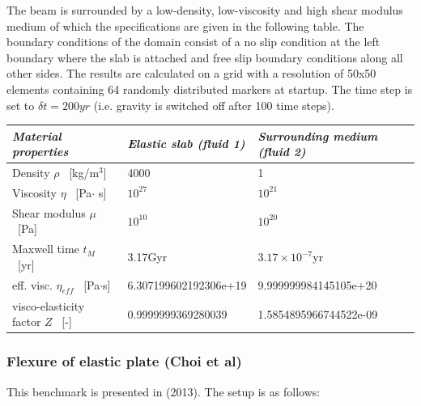 The beam is surrounded by a low-density, low-viscosity and high shear modulus medium
of which the specifications are given in  the following table.
The boundary conditions of the domain consist of a no slip condition at
the left boundary where the slab is attached and free slip boundary conditions along all other sides.
The results are calculated on a grid with a resolution of 50x50 elements containing 64 randomly distributed markers at startup.
The time step is set to $\delta t = 200yr$ (i.e. gravity is switched off after 100 time steps).

\begin{center}
\begin{tabular}{lll}
\hline
\textit{Material properties}& \textit{Elastic slab (fluid 1)}  & \textit{Surrounding medium (fluid 2)} \\
\hline
\hline
Density         $\rho$ \     [kg/m$^{3}$]      & 4000                    & 1     \\
Viscosity       $\eta$ \    [Pa$\cdot$ s]      & $10^{27}$               &   $10^{21}$     \\
Shear modulus   $\mu $ \    [Pa]               & $10^{10}$               & $10^{20}$       \\
Maxwell time $t_M$     \    [yr]               & 3.17Gyr                 &  $3.17\times10^{-7}$yr       \\
eff. visc.      $\eta_{eff}$ \ [Pa$\cdot$s]    & 6.307199602192306e+19   &  9.999999984145105e+20      \\
visco-elasticity factor $Z$      \ [-]         & 0.9999999369280039      &  1.5854895966744522e-09     \\
\hline
\end{tabular}
\end{center}








\subsubsection{Flexure of elastic plate (Choi et al) \label{sec:chtl13}}


This benchmark is presented in \textcite{chtl13} (2013). 
The setup is as follows:

